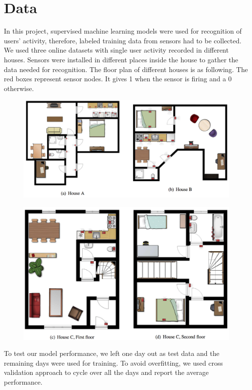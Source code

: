 \documentclass[10pt,letter]{article}
\numberwithin{equation}{section} %
\numberwithin{figure}{section} %
\numberwithin{table}{section} %
\begin{document}
\section{Data}
In this project, supervised machine learning models were used for recognition of users' activity, therefore, labeled training data from sensors had to be collected. We used three online datasets with single user activity recorded in different houses. Sensors were installed in different places inside the house to gather the data needed for recognition. The floor plan of different houses is as following. The red boxes represent sensor nodes. It gives 1 when the sensor is firing and a 0 otherwise. 
\begin{figure}[h]
    \centering
    \includegraphics[width=16cm]{data1}
\end{figure}
\newpage
\begin{figure}[h]
    \centering
    \includegraphics[width=14cm]{data2}
\end{figure}
To test our model performance, we left one day out as test data and the remaining days were used for training. To avoid overfitting, we used cross validation approach to cycle over all the days and report the average performance. 
\end{document}
